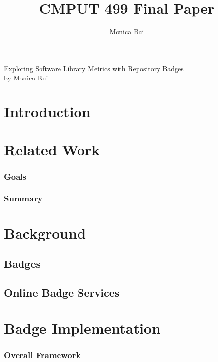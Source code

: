 \documentclass[12pt]{article}
\title{CMPUT 499 Final Paper}
\author{Monica Bui}
\begin{document}
\begin{titlepage}
    \centering
    \large
    \vspace{1cm}
    Exploring Software Library Metrics with Repository Badges \\
    \vspace{1cm}
    by
    \vspace{1cm}
    Monica Bui
\end{titlepage}

\section{Introduction}


\section{Related Work}
\subsubsection{Goals}

\subsubsection{Summary}

\section{Background}

\subsection{Badges}
\subsection{Online Badge Services}

\section{Badge Implementation}
\subsubsection{Overall Framework}
\end{document}
